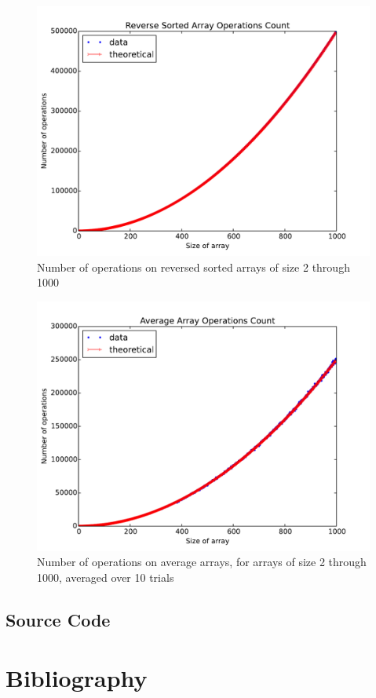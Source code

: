 \documentclass{article}
\begin{document}
        \begin{figure}[h]
            \includegraphics[width=\textwidth, height=0.4\textheight]{reverse_sorted_array_basic_operation_count}
            \caption{Number of operations on reversed sorted arrays of size 2 through 1000}
        \end{figure}
        \begin{figure}[h]
            \includegraphics[width=\textwidth, height=0.4\textheight]{random_basic_operation_count}
            \caption{Number of operations on average arrays, for arrays of size 2 through 1000, averaged over 10 trials}
        \end{figure}
    \FloatBarrier

    \subsection{Source Code}
        \newpage

\section{Bibliography}
    
\end{document}
